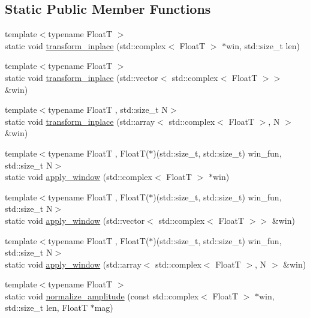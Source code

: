 \subsection*{Static Public Member Functions}
\begin{DoxyCompactItemize}
\item 
{\footnotesize template$<$typename FloatT $>$ }\\static void \hyperlink{structdevfix_1_1dsp_1_1fft_af0c91dff74868f580ad295448e50693f}{transform\+\_\+inplace} (std\+::complex$<$ FloatT $>$ $\ast$win, std\+::size\+\_\+t len)
\item 
{\footnotesize template$<$typename FloatT $>$ }\\static void \hyperlink{structdevfix_1_1dsp_1_1fft_ae3d7d5529ffad8aa929c5353252df7f5}{transform\+\_\+inplace} (std\+::vector$<$ std\+::complex$<$ FloatT $>$$>$ \&win)
\item 
{\footnotesize template$<$typename FloatT , std\+::size\+\_\+t N$>$ }\\static void \hyperlink{structdevfix_1_1dsp_1_1fft_a56cf2ee0f12d0a4c4bdcded3db38e088}{transform\+\_\+inplace} (std\+::array$<$ std\+::complex$<$ FloatT $>$, N $>$ \&win)
\item 
{\footnotesize template$<$typename FloatT , Float\+T($\ast$)(std\+::size\+\_\+t, std\+::size\+\_\+t) win\+\_\+fun, std\+::size\+\_\+t N$>$ }\\static void \hyperlink{structdevfix_1_1dsp_1_1fft_a6ffabd9d450ce2702b0ec825c6758e81}{apply\+\_\+window} (std\+::complex$<$ FloatT $>$ $\ast$win)
\item 
{\footnotesize template$<$typename FloatT , Float\+T($\ast$)(std\+::size\+\_\+t, std\+::size\+\_\+t) win\+\_\+fun, std\+::size\+\_\+t N$>$ }\\static void \hyperlink{structdevfix_1_1dsp_1_1fft_a14705eb963394aa042eec5f76696e3b2}{apply\+\_\+window} (std\+::vector$<$ std\+::complex$<$ FloatT $>$$>$ \&win)
\item 
{\footnotesize template$<$typename FloatT , Float\+T($\ast$)(std\+::size\+\_\+t, std\+::size\+\_\+t) win\+\_\+fun, std\+::size\+\_\+t N$>$ }\\static void \hyperlink{structdevfix_1_1dsp_1_1fft_a57f8a79e855a66b88eb3281b6e0797ac}{apply\+\_\+window} (std\+::array$<$ std\+::complex$<$ FloatT $>$, N $>$ \&win)
\item 
{\footnotesize template$<$typename FloatT $>$ }\\static void \hyperlink{structdevfix_1_1dsp_1_1fft_acf63d1a93180fd7669ae52353e1beb1f}{normalize\+\_\+amplitude} (const std\+::complex$<$ FloatT $>$ $\ast$win, std\+::size\+\_\+t len, FloatT $\ast$mag)

\end{DoxyCompactItemize}
